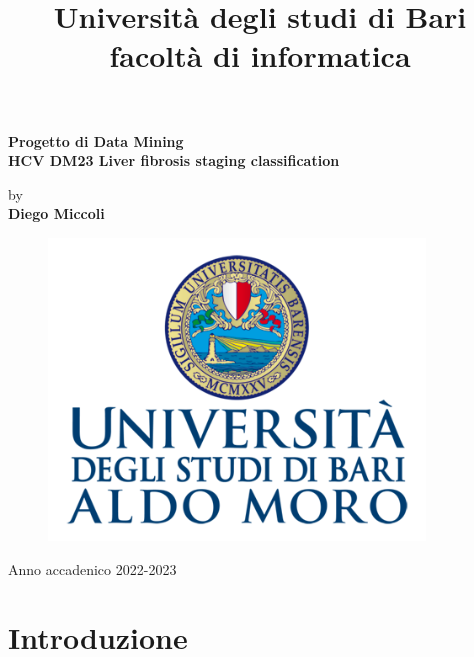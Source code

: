 \documentclass[italian,12pt,a4paper]{article}
\title{Università degli studi di Bari facoltà di informatica}
\date{} %
\begin{document}
	\maketitle
	\thispagestyle{empty}
	\begin{center}
		\huge	\textbf{Progetto di Data Mining} \\
		\Large \textbf{HCV DM23 Liver fibrosis staging classification}
	\end{center}
	
	
	
	\begin{center}
		by \\
		\Large \textbf{Diego Miccoli}
	\end{center}

	
	\begin{figure}[hb]
		\centering
		\includegraphics[width=10cm]{logoUNIlatex.png}
	\end{figure}
	
	\vfill
	\begin{center}
		Anno accadenico 2022-2023
	\end{center}
	
	\newpage
	
	\tableofcontents

	\newpage

	
	\section{Introduzione}
\end{document}
